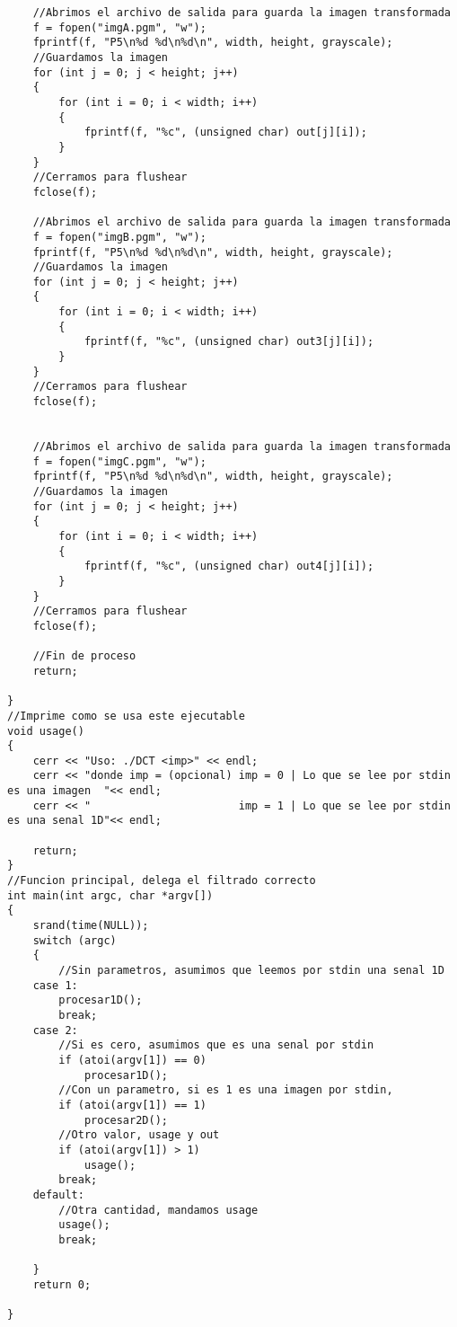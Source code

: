 \begin{lstlisting}
    //Abrimos el archivo de salida para guarda la imagen transformada
    f = fopen("imgA.pgm", "w");
    fprintf(f, "P5\n%d %d\n%d\n", width, height, grayscale);
    //Guardamos la imagen
    for (int j = 0; j < height; j++)
    {
        for (int i = 0; i < width; i++)
        {
            fprintf(f, "%c", (unsigned char) out[j][i]);
        }
    }
    //Cerramos para flushear
    fclose(f);

    //Abrimos el archivo de salida para guarda la imagen transformada
    f = fopen("imgB.pgm", "w");
    fprintf(f, "P5\n%d %d\n%d\n", width, height, grayscale);
    //Guardamos la imagen
    for (int j = 0; j < height; j++)
    {
        for (int i = 0; i < width; i++)
        {
            fprintf(f, "%c", (unsigned char) out3[j][i]);
        }
    }
    //Cerramos para flushear
    fclose(f);


    //Abrimos el archivo de salida para guarda la imagen transformada
    f = fopen("imgC.pgm", "w");
    fprintf(f, "P5\n%d %d\n%d\n", width, height, grayscale);
    //Guardamos la imagen
    for (int j = 0; j < height; j++)
    {
        for (int i = 0; i < width; i++)
        {
            fprintf(f, "%c", (unsigned char) out4[j][i]);
        }
    }
    //Cerramos para flushear
    fclose(f);

    //Fin de proceso
    return;

}
//Imprime como se usa este ejecutable
void usage()
{
    cerr << "Uso: ./DCT <imp>" << endl;
    cerr << "donde imp = (opcional) imp = 0 | Lo que se lee por stdin es una imagen  "<< endl;
    cerr << "                       imp = 1 | Lo que se lee por stdin es una senal 1D"<< endl;

    return;
}
//Funcion principal, delega el filtrado correcto
int main(int argc, char *argv[])
{
    srand(time(NULL));
    switch (argc)
    {
        //Sin parametros, asumimos que leemos por stdin una senal 1D
    case 1:
        procesar1D();
        break;
    case 2:
        //Si es cero, asumimos que es una senal por stdin
        if (atoi(argv[1]) == 0)
            procesar1D();
        //Con un parametro, si es 1 es una imagen por stdin,
        if (atoi(argv[1]) == 1)
            procesar2D();
        //Otro valor, usage y out
        if (atoi(argv[1]) > 1)
            usage();
        break;
    default:
        //Otra cantidad, mandamos usage
        usage();
        break;

    }
    return 0;

}
\end{lstlisting}
